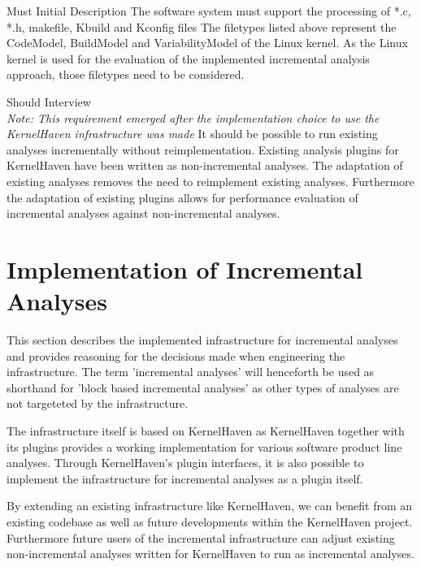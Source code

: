 \documentclass[a4paper]{article}
\begin{document}
\clearpage
\begin{req} 
\reqtable
    {Must}  {Initial Description}
	{The software system must support the processing of *.c, *.h, makefile, Kbuild and Kconfig files}
	{The filetypes listed above represent the CodeModel, BuildModel and VariabilityModel of the Linux kernel. As the Linux kernel is used for the evaluation of the implemented incremental analysis approach, those filetypes need to be considered.}
\end{req}


\begin{req} 
\reqtable
    {Should}  {Interview \\ \emph{Note: This requirement emerged after the implementation choice to use the KernelHaven infrastructure was made}}
	{It should be possible to run existing analyses incrementally without reimplementation.}
	{Existing analysis plugins for KernelHaven have been written as non-incremental analyses. The adaptation of existing analyses removes the need to reimplement existing analyses. Furthermore the adaptation of existing plugins allows for performance evaluation of incremental analyses against non-incremental analyses.}
\end{req}

\newpage

\section{Implementation of Incremental Analyses}\label{implementation}

This section describes the implemented infrastructure for incremental analyses and provides reasoning for the decisions made when engineering the infrastructure. The term 'incremental analyses' will henceforth be used as shorthand for  'block based incremental analyses' as other types of analyses are not targeteted by the infrastructure.

The infrastructure itself is based on KernelHaven\cite{KernelHaven} as KernelHaven together with its plugins provides a working implementation for various software product line analyses. Through KernelHaven's plugin interfaces, it is also possible to implement the infrastructure for incremental analyses as a plugin itself.

By extending an existing infrastructure like KernelHaven, we can benefit from an existing codebase as well as future developments within the KernelHaven project. Furthermore future users of the incremental infrastructure can adjust existing non-incremental analyses written for KernelHaven to run as incremental analyses.
\end{document}
